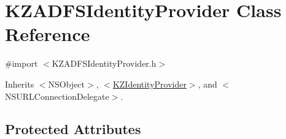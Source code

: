 \hypertarget{interface_k_z_a_d_f_s_identity_provider}{\section{K\-Z\-A\-D\-F\-S\-Identity\-Provider Class Reference}
\label{interface_k_z_a_d_f_s_identity_provider}
}


{\ttfamily \#import $<$K\-Z\-A\-D\-F\-S\-Identity\-Provider.\-h$>$}



Inherits $<$\-N\-S\-Object$>$, \hyperlink{protocol_k_z_identity_provider-p}{$<$\-K\-Z\-Identity\-Provider$>$}, and $<$\-N\-S\-U\-R\-L\-Connection\-Delegate$>$.

\subsection*{Protected Attributes}

